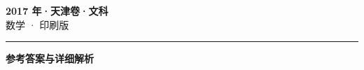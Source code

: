 \documentclass[zihao=5, a4paper]{ctexart}
\begin{document}
\begin{center}
  {\Large\bfseries 2017 年·天津卷·文科}\\[4pt]
  {\large 数学 · 印刷版}
\end{center}
\medskip
{}

\par\bigskip\hrule\bigskip
{}
\begin{center}{\large\bfseries 参考答案与详细解析}\end{center}
\smallskip

\end{document}
